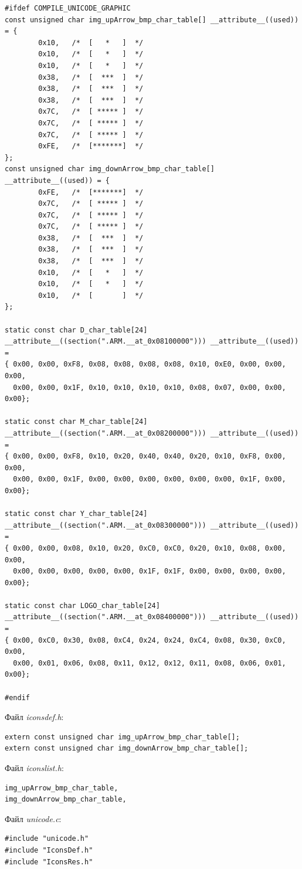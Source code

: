 \documentclass[oneside,14pt]{extarticle}
\begin{document}
\begin{normalsize}
{\begin{lstlisting}
#ifdef COMPILE_UNICODE_GRAPHIC
const unsigned char img_upArrow_bmp_char_table[] __attribute__((used)) = {
		0x10, 	/*  [   *   ]  */
		0x10, 	/*  [   *   ]  */
		0x10, 	/*  [   *   ]  */
		0x38, 	/*  [  ***  ]  */
		0x38, 	/*  [  ***  ]  */
		0x38, 	/*  [  ***  ]  */
		0x7C, 	/*  [ ***** ]  */
		0x7C, 	/*  [ ***** ]  */
		0x7C, 	/*  [ ***** ]  */
		0xFE, 	/*  [*******]  */		
};		
const unsigned char img_downArrow_bmp_char_table[] __attribute__((used)) = {
		0xFE, 	/*  [*******]  */
		0x7C, 	/*  [ ***** ]  */
		0x7C, 	/*  [ ***** ]  */
		0x7C, 	/*  [ ***** ]  */
		0x38, 	/*  [  ***  ]  */
		0x38, 	/*  [  ***  ]  */
		0x38, 	/*  [  ***  ]  */
		0x10, 	/*  [   *   ]  */
		0x10, 	/*  [   *   ]  */
		0x10, 	/*  [       ]  */
};

static const char D_char_table[24] __attribute__((section(".ARM.__at_0x08100000"))) __attribute__((used)) =
{ 0x00, 0x00, 0xF8, 0x08, 0x08, 0x08, 0x08, 0x10, 0xE0, 0x00, 0x00, 0x00,
  0x00, 0x00, 0x1F, 0x10, 0x10, 0x10, 0x10, 0x08, 0x07, 0x00, 0x00, 0x00};
	
static const char M_char_table[24] __attribute__((section(".ARM.__at_0x08200000"))) __attribute__((used)) =
{ 0x00, 0x00, 0xF8, 0x10, 0x20, 0x40, 0x40, 0x20, 0x10, 0xF8, 0x00, 0x00,
  0x00, 0x00, 0x1F, 0x00, 0x00, 0x00, 0x00, 0x00, 0x00, 0x1F, 0x00, 0x00};
	
static const char Y_char_table[24] __attribute__((section(".ARM.__at_0x08300000"))) __attribute__((used)) =
{ 0x00, 0x00, 0x08, 0x10, 0x20, 0xC0, 0xC0, 0x20, 0x10, 0x08, 0x00, 0x00,
  0x00, 0x00, 0x00, 0x00, 0x00, 0x1F, 0x1F, 0x00, 0x00, 0x00, 0x00, 0x00};

static const char LOGO_char_table[24] __attribute__((section(".ARM.__at_0x08400000"))) __attribute__((used))  =
{ 0x00, 0xC0, 0x30, 0x08, 0xC4, 0x24, 0x24, 0xC4, 0x08, 0x30, 0xC0, 0x00,
  0x00, 0x01, 0x06, 0x08, 0x11, 0x12, 0x12, 0x11, 0x08, 0x06, 0x01, 0x00};

#endif
		\end{lstlisting}
	}
	Файл \textit{iconsdef.h}:
	{\small
		\begin{lstlisting}
extern const unsigned char img_upArrow_bmp_char_table[];
extern const unsigned char img_downArrow_bmp_char_table[];
		\end{lstlisting}
	}
	Файл \textit{iconslist.h}:
	{\small
		\begin{lstlisting}
img_upArrow_bmp_char_table,
img_downArrow_bmp_char_table,
		\end{lstlisting}
	}
	Файл \textit{unicode.c}:
	{\small
		\begin{lstlisting}
#include "unicode.h"
#include "IconsDef.h"
#include "IconsRes.h"


\end{lstlisting}}
\end{normalsize}
\end{document}
